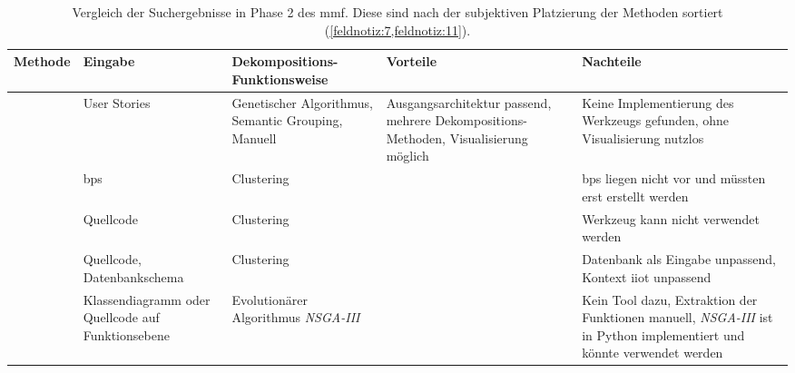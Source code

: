 \begin{table}[!h]
  \centering
  \begin{tabular}{l m{1.9cm} m{3.1cm} m{3.1cm} m{3.1cm}}
    \toprule
    \textbf{Methode}                     & \textbf{Eingabe} & \textbf{Dekompositions-Funktionsweise} & \textbf{Vorteile} & \textbf{Nachteile} \\ \midrule
    \cite{arh-result-no-filter-2}        & User Stories & Genetischer Algorithmus, Semantic Grouping, Manuell & Ausgangsarchitektur passend, mehrere Dekompositions-Methoden, Visualisierung möglich & Keine Implementierung des Werkzeugs gefunden, ohne Visualisierung nutzlos \\ \hline
    \cite{arh-result-no-filter-3}        & \glspl{bp} & Clustering & & \glspl{bp} liegen nicht vor und müssten erst erstellt werden  \\ \hline
    \cite{arh-result-no-filter-5}        & Quellcode & Clustering & & Werkzeug kann nicht verwendet wer\-den \\ \hline
    \cite{arh-result-important-filter-4} & Quellcode, Daten\-bank\-schema & Clustering & & Datenbank als Ein\-ga\-be unpassend, Kontext \gls{iiot} unpassend \\ \hline
    \cite{arh-result-important-filter-7} & Klassen\-dia\-gramm oder Quell\-code auf Funk\-tions\-ebene & Evolutionärer Algorithmus \emph{NSGA-III} & & Kein Tool dazu, Extraktion der Funktionen manuell, \emph{NSGA-III} ist in Python implementiert und könnte verwendet werden \\ \bottomrule
  \end{tabular}
  \caption[Vergleich der Suchergebnisse in Phase 2 des \gls{mmf}]{
    Vergleich der Suchergebnisse in Phase 2 des \gls{mmf}.
    Diese sind nach der subjektiven Platzierung der Methoden sortiert (\cref{feldnotiz:7,feldnotiz:11}).
  }
  \label{tab:phase2-comparison}
\end{table}